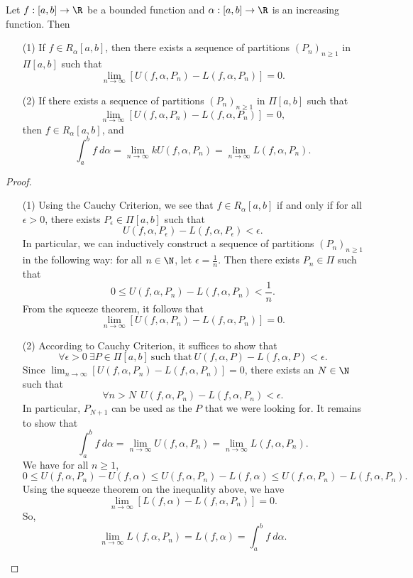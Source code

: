 \begin{theorem}\label{Sequential Criterion for integrability}
    Let \( f: [a,b] \to \R  \) be a bounded function and \( \alpha: [a,b] \to \R  \) is an increasing function. Then
    \begin{enumerate}
        \item[(1)] If \( f \in {R}_{\alpha}[a,b]  \), then there exists a sequence of partitions \( ({P}_{n})_{n \geq 1}  \) in \( \Pi [a,b] \) such that 
            \[ \lim_{ n \to \infty  }  [U(f,\alpha, {P}_{n}) - L(f,\alpha, {P}_{n}) ] = 0.  \]
        \item[(2)] If there exists a sequence of partitions \( ({P}_{n})_{n \geq 1} \) in \( \Pi [a,b] \) such that \[ \lim_{ n \to \infty  } [U(f,\alpha, {P}_{n}) - L(f,\alpha, {P}_{n})] = 0,  \] then \( f \in {R}_{\alpha}[a,b] \), and 
            \[  \int_{ a }^{ b }  f  \ d \alpha = \lim_{ n \to \infty  } k U(f,\alpha, {P}_{n}) = \lim_{ n \to \infty  }  L(f,\alpha, {P}_{n}).  \]
    \end{enumerate}
\end{theorem}
\begin{proof}
\begin{enumerate}
    \item[(1)] Using the Cauchy Criterion, we see that \( f \in {R}_{\alpha}[a,b] \) if and only if for all \( \epsilon > 0  \), there exists \( {P}_{\epsilon} \in \Pi [a,b] \) such that 
        \[  U(f,\alpha,{P}_{\epsilon}) - L(f,\alpha, {P}_{\epsilon})  < \epsilon. \]
        In particular, we can inductively construct a sequence of partitions \( ({P}_{n})_{n \geq 1 } \) in the following way: for all \( n \in \N \), let \( \epsilon = \frac{ 1 }{ n }  \). Then there exists \( {P}_{n} \in \Pi  \) such that  
        \[   0 \leq U(f,\alpha, {P}_{n}) - L(f,\alpha, {P}_{n}) < \frac{ 1 }{ n }.  \]
       From the squeeze theorem, it follows that  
       \[  \lim_{ n \to \infty  } [U(f,\alpha, {P}_{n}) - L(f,\alpha, {P}_{n})] = 0.  \]
    \item[(2)] According to Cauchy Criterion, it suffices to show that 
        \[  \forall \epsilon > 0 \ \exists P \in \Pi [a,b] \ \text{such that} \ U(f,\alpha,P) - L(f,\alpha,P) < \epsilon. \]
        Since \( \lim_{ n \to \infty  } [U(f,\alpha, {P}_{n}) - L(f,\alpha, {P}_{n})] = 0  \), there exists an \( N \in \N \) such that 
        \[  \forall n > N \ \ U(f,\alpha,{P}_{n}) - L(f,\alpha,{P}_{n}) < \epsilon. \]
        In particular, \( {P}_{N+1} \) can be used as the \( P  \) that we were looking for. It remains to show that 
        \[  \int_{ a }^{ b }  f  \ d \alpha = \lim_{ n \to \infty  }  U(f,\alpha,{P}_{n}) = \lim_{ n \to \infty  }  L(f,\alpha, {P}_{n}). \]
        We have for all \( n \geq 1  \), 
        \[  0 \leq U(f,\alpha,{P}_{n}) - U(f,\alpha) \leq U(f,\alpha, {P}_{n}) - L(f,\alpha) \leq U(f,\alpha, {P}_{n}) - L(f,\alpha, {P}_{n}). \]
        Using the squeeze theorem on the inequality above, we have 
        \[  \lim_{ n \to \infty  } [L(f,\alpha) - L(f,\alpha,{P}_{n})] = 0.  \]
        So, 
        \[  \lim_{ n \to \infty  } L(f,\alpha,{P}_{n}) = L(f,\alpha) = \int_{ a }^{ b }  f  \ d \alpha. \]
\end{enumerate}
\end{proof}


